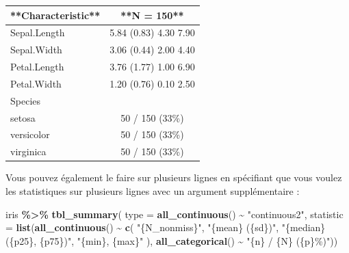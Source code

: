 \documentclass[
]{book}
\newenvironment{Shaded}{\begin{snugshade}}{\end{snugshade}}
\newcommand{\AttributeTok}[1]{\textcolor[rgb]{0.13,0.29,0.53}{#1}}
\newcommand{\FunctionTok}[1]{\textcolor[rgb]{0.13,0.29,0.53}{\textbf{#1}}}
\newcommand{\NormalTok}[1]{#1}
\newcommand{\SpecialCharTok}[1]{\textcolor[rgb]{0.81,0.36,0.00}{\textbf{#1}}}
\newcommand{\StringTok}[1]{\textcolor[rgb]{0.31,0.60,0.02}{#1}}
\begin{document}
\begin{tabular}{l|c}
\hline
**Characteristic** & **N = 150**\\
\hline
Sepal.Length & 5.84 (0.83) 4.30 7.90\\
\hline
Sepal.Width & 3.06 (0.44) 2.00 4.40\\
\hline
Petal.Length & 3.76 (1.77) 1.00 6.90\\
\hline
Petal.Width & 1.20 (0.76) 0.10 2.50\\
\hline
Species & \\
\hline
setosa & 50 / 150 (33\%)\\
\hline
versicolor & 50 / 150 (33\%)\\
\hline
virginica & 50 / 150 (33\%)\\
\hline
\end{tabular}

Vous pouvez également le faire sur plusieurs lignes en spécifiant que vous voulez
les statistiques sur plusieurs lignes avec un argument supplémentaire :

\begin{Shaded}
\begin{Highlighting}[]
\NormalTok{iris }\SpecialCharTok{\%\textgreater{}\%}
  \FunctionTok{tbl\_summary}\NormalTok{(}
    \AttributeTok{type =} \FunctionTok{all\_continuous}\NormalTok{() }\SpecialCharTok{\textasciitilde{}} \StringTok{"continuous2"}\NormalTok{,}
    \AttributeTok{statistic =} \FunctionTok{list}\NormalTok{(}\FunctionTok{all\_continuous}\NormalTok{() }\SpecialCharTok{\textasciitilde{}} \FunctionTok{c}\NormalTok{(}
      \StringTok{"\{N\_nonmiss\}"}\NormalTok{,}
      \StringTok{"\{mean\} (\{sd\})"}\NormalTok{,}
      \StringTok{"\{median\} (\{p25\}, \{p75\})"}\NormalTok{,}
      \StringTok{"\{min\}, \{max\}"}
\NormalTok{    ), }\FunctionTok{all\_categorical}\NormalTok{() }\SpecialCharTok{\textasciitilde{}} \StringTok{"\{n\} / \{N\} (\{p\}\%)"}\NormalTok{))}
\end{Highlighting}
\end{Shaded}
\end{document}
